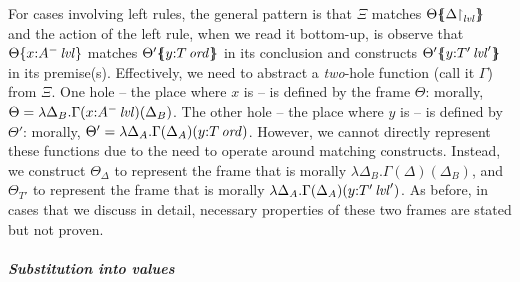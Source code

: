 For cases involving left rules, the general pattern is that
$\Xi$ matches ${\Theta}\mbox{$\{\hspace{-4pt}\{$}{\ensuremath{{\Delta}{\upharpoonright}_{{\it lvl}}}}\mbox{$\}\hspace{-4pt}\}$}$ and
the action of the left rule, when we read it bottom-up, is observe that  
${\Theta}\{{x{:}{A^-}\,{{\it lvl}}}\}$ matches 
${\Theta'}\mbox{$\{\hspace{-4pt}\{$}{y{:}{T}\,{{\it ord}}}\mbox{$\}\hspace{-4pt}\}$}$ in its conclusion and constructs 
${\Theta'}\mbox{$\{\hspace{-4pt}\{$}{y{:}{T'}\,{{\it lvl}}'}\mbox{$\}\hspace{-4pt}\}$}$ in its premise(s). 
Effectively, we need to abstract
a {\it two}-hole function (call it $\Gamma$) from $\Xi$. 
One hole -- the place where $x$ is --
is defined by the frame $\Theta$: morally, 
$\Theta = \lambda \Delta_B. \Gamma(x{:}{A^-}\,{{\it lvl}})(\Delta_B)$.
The other hole -- the place where $y$ is -- 
is defined by $\Theta'$: morally,
$\Theta' = \lambda \Delta_A. \Gamma(\Delta_A)(y{:}{T}\,{{\it ord}})$. 
However, we cannot directly represent these functions due to
the need to operate around matching constructs. Instead, we 
construct $\Theta_\Delta$ to represent the frame that is
morally $\lambda \Delta_B. \Gamma(\Delta)(\Delta_B)$, and 
$\Theta_{T'}$ to represent the frame that is morally
$\lambda \Delta_A. \Gamma(\Delta_A)(y{:}{T'}\,{{\it lvl}}')$. As before, in
cases that we discuss in detail, necessary properties of these
two frames are stated but not proven.


\paragraph{\it Substitution into values}


